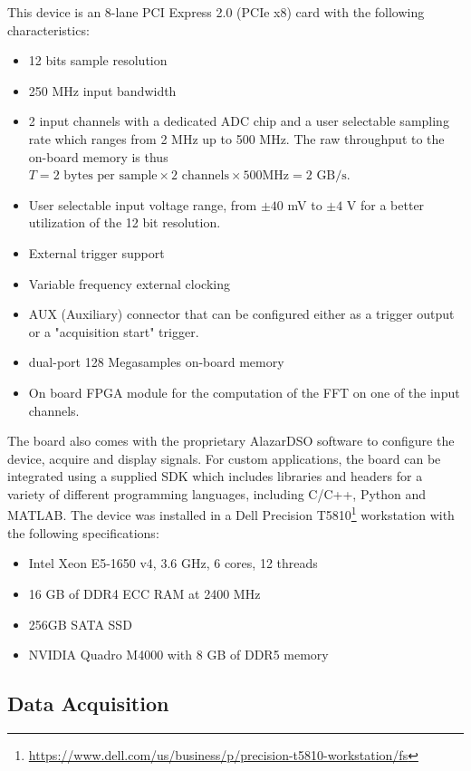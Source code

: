 	This device is an 8-lane PCI Express 2.0 (PCIe x8) card with the following characteristics:
	\begin{itemize}
		\item 12 bits sample resolution
		\item 250 MHz input bandwidth
		\item 2 input channels with a dedicated \ac{ADC} chip and a user selectable sampling rate which ranges from 2 MHz up to 500 MHz. The raw throughput to the on-board memory is thus $T = 2 \text{ bytes per sample} \times 2 \text{ channels} \times 500 \text{MHz} = 2 \text{ GB/s}$.
		\item User selectable input voltage range, from $\pm 40$ mV to $\pm 4$ V for a better utilization of the 12 bit resolution.
		
		\item External trigger support
		\item Variable frequency external clocking
		\item AUX (Auxiliary) connector that can be configured either as a trigger output or a "acquisition start" trigger. 
		
		\item dual-port 128 Megasamples on-board memory
		
		\item On board \ac{FPGA} module for the computation of the \ac{FFT} on one of the input channels. 
		
	\end{itemize}


	The board also comes with the proprietary AlazarDSO software to configure the device, acquire and display signals. For custom applications, the board can be integrated using a supplied \ac{SDK} which includes libraries and headers for a variety of different programming languages, including C/C++, Python and MATLAB. The device was installed in a Dell Precision T5810\footnote{\url{https://www.dell.com/us/business/p/precision-t5810-workstation/fs}} workstation with the following specifications:
	\begin{itemize}
		\item Intel Xeon E5-1650 v4, 3.6 GHz, 6 cores, 12 threads
		\item 16 GB of DDR4 ECC RAM at 2400 MHz
		\item 256GB SATA SSD
		\item NVIDIA Quadro M4000 with 8 GB of DDR5 memory
	\end{itemize}
	

    \subsection{Data Acquisition}
    
